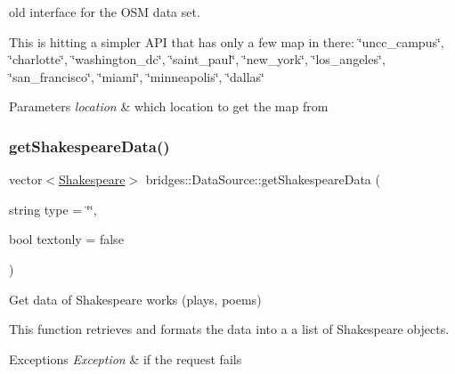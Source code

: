 old interface for the O\+SM data set. 

This is hitting a simpler A\+PI that has only a few map in there\+: \char`\"{}uncc\+\_\+campus\char`\"{}, \char`\"{}charlotte\char`\"{}, \char`\"{}washington\+\_\+dc\char`\"{}, \char`\"{}saint\+\_\+paul\char`\"{}, \char`\"{}new\+\_\+york\char`\"{}, \char`\"{}los\+\_\+angeles\char`\"{}, \char`\"{}san\+\_\+francisco\char`\"{}, \char`\"{}miami\char`\"{}, \char`\"{}minneapolis\char`\"{}, \char`\"{}dallas\char`\"{}


\begin{DoxyParams}{Parameters}
{\em location} & which location to get the map from \\
\hline
\end{DoxyParams}
\mbox{\label{classbridges_1_1_data_source_a8b73299a4c1c71d2e32431a8d4a7be81}} 
\subsubsection{\texorpdfstring{get\+Shakespeare\+Data()}{getShakespeareData()}}
{\footnotesize\ttfamily vector$<$\hyperlink{classbridges_1_1dataset_1_1_shakespeare}{Shakespeare}$>$ bridges\+::\+Data\+Source\+::get\+Shakespeare\+Data (\begin{DoxyParamCaption}\item[{string}]{type = {\ttfamily \char`\"{}\char`\"{}},  }\item[{bool}]{textonly = {\ttfamily false} }\end{DoxyParamCaption})\hspace{0.3cm}{\ttfamily [inline]}}



Get data of Shakespeare works (plays, poems) 

This function retrieves and formats the data into a a list of Shakespeare objects.


\begin{DoxyExceptions}{Exceptions}
{\em Exception} & if the request fails\\
\hline
\end{DoxyExceptions}

